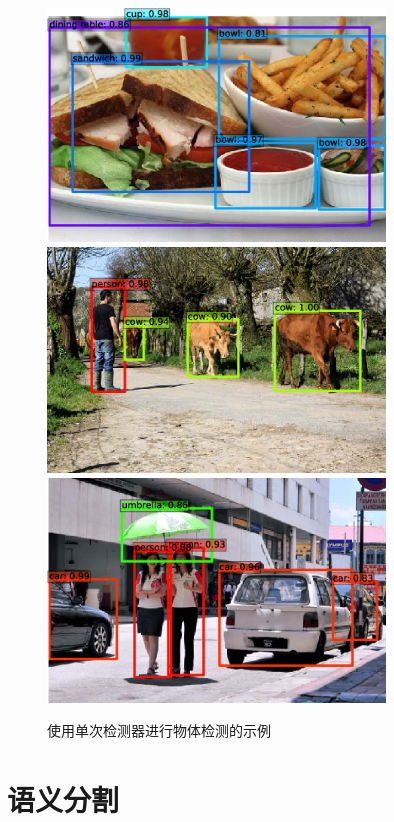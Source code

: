 \begin{figure}
    \centering
    \includegraphics[width=0.8\textwidth]{fig/fig6.2-1.png}
    \includegraphics[width=0.8\textwidth]{fig/fig6.2-2.png}
    \includegraphics[width=0.8\textwidth]{fig/fig6.2-3.png}
    \caption[使用 SSD 进行物体检测]{使用单次检测器进行物体检测的示例 \citep{arxiv-1512.02325}}
    \label{fig6.2}
\end{figure}

\section{语义分割}\label{sec6.4}

